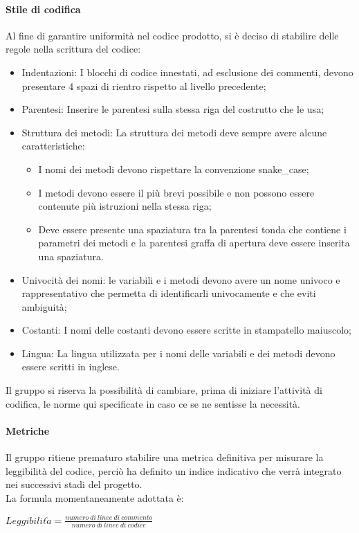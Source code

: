 \documentclass[../norme_di_progetto.tex]{subfiles}
\begin{document}
 
 \paragraph{Stile di codifica}
 Al fine di garantire uniformità nel codice prodotto, si è deciso di stabilire delle regole nella scrittura del codice:
 \begin{itemize}
     \item Indentazioni: I blocchi di codice innestati, ad esclusione dei commenti, devono presentare 4 spazi di rientro rispetto al livello precedente;
     \item Parentesi: Inserire le parentesi sulla stessa riga del costrutto che le usa;
     \item Struttura dei metodi: La struttura dei metodi deve sempre avere alcune caratteristiche:
     \begin{itemize}
         \item I nomi dei metodi devono rispettare la convenzione snake\_case;
         \item I metodi devono essere il più brevi possibile e non possono essere contenute più istruzioni nella stessa riga;
         \item Deve essere presente una spaziatura tra la parentesi tonda che contiene i parametri dei metodi e la parentesi graffa di apertura deve essere inserita una spaziatura.
     \end{itemize}
     \item Univocità dei nomi: le variabili e i metodi devono avere un nome univoco e rappresentativo che permetta di identificarli univocamente e che eviti ambiguità;
     \item Costanti: I nomi delle costanti devono essere scritte in stampatello maiuscolo;
     \item Lingua: La lingua utilizzata per i nomi delle variabili e dei metodi devono essere scritti in inglese.
 \end{itemize}
 Il gruppo si riserva la possibilità di cambiare, prima di iniziare l'attività di codifica, le norme qui specificate in caso ce se ne sentisse la necessità.
 
 \paragraph{Metriche}
  Il gruppo ritiene prematuro stabilire una metrica definitiva per misurare la leggibilità del codice, perciò ha definito un indice indicativo che verrà integrato nei successivi stadi del progetto.\\
  La formula momentaneamente adottata è:
  \begin{center}
      $Leggibilit\grave{a} = \frac{numero\ di\ linee\ di\ commento}{numero\ di\ linee\ di\ codice}$
  \end{center}
 
\end{document}
